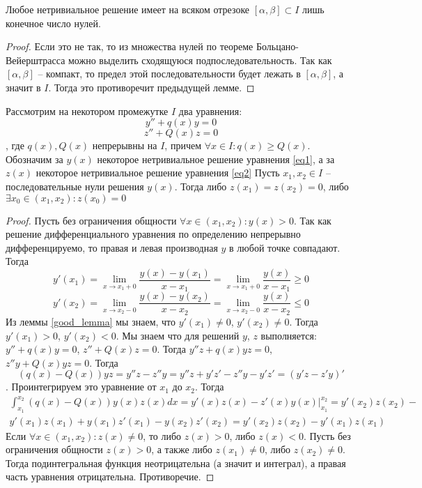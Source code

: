 \documentclass[document.tex]{subfiles}
\begin{document}
\begin{corollary}
    Любое нетривиальное решение имеет на всяком отрезоке $[\alpha, \beta] \subset I$ лишь конечное число нулей.
\end{corollary}

\begin{proof}
    Если это не так, то из множества нулей по теореме Больцано-Вейерштрасса можно выделить сходящуюся
    подпоследовательность. Так как $[\alpha, \beta]$ -- компакт, то предел этой последовательности будет лежать в
    $[\alpha, \beta]$, а значит в $I$. Тогда это противоречит предыдущей лемме.
\end{proof}

\begin{theorem}[Штурм]
    Рассмотрим на некотором промежутке $I$ два уравнения:
    \begin{equation}
        \label{eq1}
        y'' + q(x)y = 0
    \end{equation}
    \begin{equation}
        \label{eq2}
        z'' + Q(x)z = 0
    \end{equation}, где $q(x), Q(x)$ непрерывны на $I$, причем $\forall x \in I: q(x) \geq Q(x)$. Обозначим за $y(x)$
    некоторое нетривиальное решение уравнения \ref{eq1}, а за $z(x)$ некоторое нетривиальное решение уравнения \ref{eq2}
    Пусть $x_1, x_2 \in I$ -- последовательные нули решения $y(x)$. Тогда либо $z(x_1) = z(x_2) = 0$, либо $\exists x_0
    \in (x_1, x_2): z(x_0) = 0$
\end{theorem}

\begin{proof}
    Пусть без ограничения общности $\forall x \in (x_1, x_2): y(x) > 0$. Так как решение дифференциального уравнения по
    определению непрерывно дифференцируемо, то правая и левая производная $y$ в любой точке совпадают. Тогда
    \[
        y'(x_1) = \lim_{x \rightarrow x_1 + 0}
        \frac{y(x) - y(x_1)}{x - x_1} = \lim_{x \rightarrow  x_1 + 0} \frac{y(x)}{x - x_1} \geq 0
    \]
    \[
        y'(x_2) = \lim_{x \rightarrow x_2 - 0} \frac{y(x) - y(x_2)}{x - x_2} = \lim_{x \rightarrow x_2 - 0}
        \frac{y(x)}{x - x_2} \leq 0
    \]
    Из леммы \ref{good_lemma} мы знаем, что $y'(x_1) \neq 0$, $y'(x_2) \neq 0$. Тогда $y'(x_1) > 0$, $y'(x_2) < 0$. Мы
    знаем что для решений $y$, $z$ выполняется:
    $y'' + q(x)y = 0$, $z'' + Q(x)z = 0$. Тогда $y''z + q(x)yz = 0$, $z''y + Q(x)yz = 0$.
    Тогда
    \[
        (q(x) - Q(x))yz = y''z - z''y = y''z + y'z' - z''y - y'z' = (y'z - z'y)'
    \].
    Проинтегрируем это уравнение от $x_1$ до $x_2$.
    Тогда
    \begin{multline*}
        \int_{x_1}^{x_2}(q(x) - Q(x))y(x)z(x)dx = y'(x)z(x) - z'(x)y(x) \Big|_{x_1}^{x_2} = y'(x_2)z(x_2) -\\
        y'(x_1)z(x_1) + y(x_1)z'(x_1) - y(x_2)z'(x_2) = y'(x_2)z(x_2) - y'(x_1)z(x_1)
    \end{multline*}
    Если $\forall x \in (x_1, x_2): z(x) \neq 0$, то либо $z(x) > 0$, либо $z(x) < 0$. Пусть без ограничения общности
    $z(x) > 0$, а также либо $z(x_1) \neq 0$, либо $z(x_2) \neq 0$. Тогда подинтегральная функция неотрицательна (а
    значит и интеграл), а правая часть уравнения отрицательна. Противоречие.
\end{proof}
\end{document}
